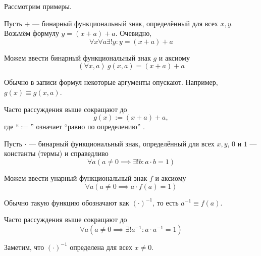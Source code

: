 Рассмотрим примеры.
\begin{fullwidth}
  \begin{multicols}{2}
    \raggedcolumns
    Пусть $+$ --- бинарный функциональный знак,
    определённый для всех $x,y$.
    Возьмём формулу $y=(x+a)+a$. Очевидно,
    \[
      \forall x\forall a\exists !y:y=(x+a)+a
    \]

    Можем ввести бинарный функциональный знак $g$ и аксиому
    \[
      (\forall x,a)~g(x,a)=(x+a)+a
    \]

    Обычно в записи формул некоторые аргументы опускают.
    Например, $g(x)\equiv g(x,a)$.

    Часто рассуждения выше сокращают до
    \[
      g(x):=(x+a)+a,
    \]
    где ``$:=$'' означает ``равно по определению''
    .
    \columnbreak

    Пусть $\cdot$ --- бинарный функциональный знак,
    определённый для всех $x,y$,
    $0$ и $1$ --- константы (термы) и справедливо
    \[
      \forall a(a\neq 0\implies \exists !b:a\cdot b=1)
    \]

    Можем ввести унарный функциональный знак $f$ и аксиому
    \[
      \forall a(a\neq 0\implies a\cdot f(a)=1)
    \]

    Обычно такую функцию обозначают как $(\cdot)^{-1}$,
    то есть $a^{-1}\equiv f(a)$.

    Часто рассуждения выше сокращают до
    \[
      \forall a(a\neq 0\implies \exists !a^{-1}:a\cdot a^{-1}=1)
    \]

    Заметим, что $(\cdot)^{-1}$ определена для всех $x\neq 0$.
  \end{multicols}
\end{fullwidth}

\pagebreak
